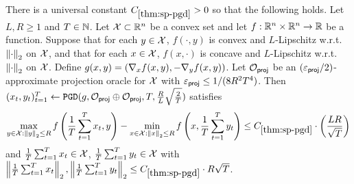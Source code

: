 \begin{theorem}\label{thm:sp-pgd}
There is a universal constant $C_{\ref{thm:sp-pgd}}>0$ so that the following holds. Let $L,R\geq 1$ and $T \in \mathbb{N}$. Let $\mathcal{X} \subset \mathbb{R}^n$ be a convex set and let $f: \mathbb{R}^n \times \mathbb{R}^n \to \mathbb{R}$ be a function. Suppose that for each $y \in \mathcal{X}$, $f(\cdot,y)$ is convex and $L$-Lipschitz w.r.t. $\left \lVert \cdot \right \rVert_2$ on $\mathcal{X}$, and that for each $x \in \mathcal{X}$, $f(x,\cdot)$ is concave and $L$-Lipschitz w.r.t. $\left \lVert \cdot \right \rVert_2$ on $\mathcal{X}$. Define $g(x,y) = (\nabla_x f(x,y), -\nabla_y f(x,y))$. Let $\mathcal{O}_{\mathsf{proj}}$ be an $(\varepsilon_{\mathsf{proj}}/2)$-approximate projection oracle for $\mathcal{X}$ with $\varepsilon_{\mathsf{proj}} \leq 1/(8R^2 T^4)$. Then $(x_t,y_t)_{t=1}^T \gets \texttt{PGD}(g, \mathcal{O}_{\mathsf{proj}} \oplus \mathcal{O}_{\mathsf{proj}}, T, \frac{R}{L}\sqrt{\frac{2}{T}})$ satisfies
\begin{equation} \max_{y \in \mathcal{X}: \left \lVert y \right \rVert_2 \leq R} f\left(\frac{1}{T}\sum_{t=1}^T x_t, y\right) - \min_{x \in \mathcal{X}: \left \lVert x \right \rVert_2 \leq R} f\left(x, \frac{1}{T}\sum_{t=1}^T y_t\right) \leq C_{\ref{thm:sp-pgd}} \cdot \left(\frac{LR}{\sqrt{T}}\right)
\label{eq:sp-guarantee}
\end{equation}
and $\frac{1}{T}\sum_{t=1}^T x_t \in \mathcal{X}$, $\frac{1}{T}\sum_{t=1}^T y_t \in \mathcal{X}$ with $\left \lVert \frac{1}{T}\sum_{t=1}^T x_t \right \rVert_2,\left \lVert \frac{1}{T}\sum_{t=1}^T y_t \right \rVert_2 \leq C_{\ref{thm:sp-pgd}} \cdot R\sqrt{T}$.
\end{theorem}

